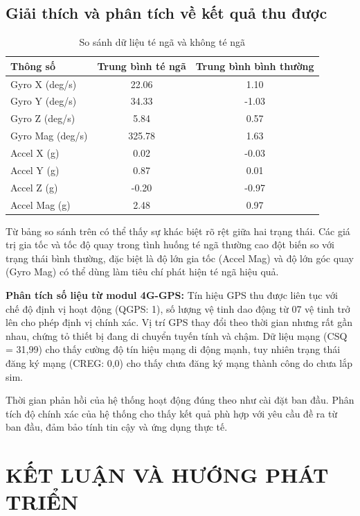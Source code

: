 \documentclass[a4paper,12pt]{report}
\begin{document}
	\newpage 
	
	\section{Giải thích và phân tích về kết quả thu được}
	
	\begin{table}[h]
		\centering
		\caption{So sánh dữ liệu té ngã và không té ngã}
		\label{tab:comparison}
		\begin{tabular}{|l|c|c|}
			\hline
			\textbf{Thông số} & \textbf{Trung bình té ngã} & \textbf{Trung bình bình thường} \\
			\hline
			Gyro X (deg/s) & 22.06 & 1.10 \\
			Gyro Y (deg/s) & 34.33 & -1.03 \\
			Gyro Z (deg/s) & 5.84 & 0.57 \\
			Gyro Mag (deg/s) & 325.78 & 1.63 \\
			Accel X (g) & 0.02 & -0.03 \\
			Accel Y (g) & 0.87 & 0.01 \\
			Accel Z (g) & -0.20 & -0.97 \\
			Accel Mag (g) & 2.48 & 0.97 \\
			\hline
		\end{tabular}
	\end{table}
	
	Từ bảng so sánh trên có thể thấy sự khác biệt rõ rệt giữa hai trạng thái. Các giá trị gia tốc và tốc độ quay trong tình huống té ngã thường cao đột biến so với trạng thái bình thường, đặc biệt là độ lớn gia tốc (Accel Mag) và độ lớn góc quay (Gyro Mag) có thể dùng làm tiêu chí phát hiện té ngã hiệu quả.
	
	\textbf{Phân tích số liệu từ modul 4G-GPS:} Tín hiệu GPS thu được liên tục với chế độ định vị hoạt động (QGPS: 1), số lượng vệ tinh dao động từ 07 vệ tinh trở lên cho phép định vị chính xác. Vị trí GPS thay đổi theo thời gian nhưng rất gần nhau, chứng tỏ thiết bị đang di chuyển tuyến tính và chậm. Dữ liệu mạng (CSQ = 31,99) cho thấy cường độ tín hiệu mạng di động mạnh, tuy nhiên trạng thái đăng ký mạng (CREG: 0,0) cho thấy chưa đăng ký mạng thành công do chưa lắp sim.
	
	Thời gian phản hồi của hệ thống hoạt động đúng theo như cài đặt ban đầu. Phân tích độ chính xác của hệ thống cho thấy kết quả phù hợp với yêu cầu đề ra từ ban đầu, đảm bảo tính tin cậy và ứng dụng thực tế.
	
	\chapter{KẾT LUẬN VÀ HƯỚNG PHÁT TRIỂN}
	
\end{document}
